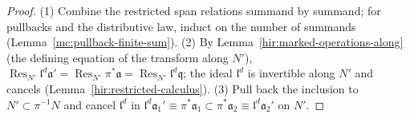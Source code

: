 \begin{proof}
\leanok
(1) Combine the restricted span relations summand by summand; for pullbacks and the distributive law, induct on the number of summands
(Lemma~\ref{mc:pullback-finite-sum}). (2) By Lemma~\ref{hir:marked-operations-along} (the defining equation of the transform along \(N'\)),
\(\operatorname{Res}_{N'}\mathfrak l^d\mathfrak a'=\operatorname{Res}_{N'}\pi^*\mathfrak a=\operatorname{Res}_{N'}\mathfrak l^d\mathfrak q\); the ideal \(\mathfrak l^d\) is invertible along
\(N'\) and cancels (Lemma~\ref{hir:restricted-calculus}). (3) Pull back the inclusion to \(N'\subset\pi^{-1}N\) and cancel \(\mathfrak l^d\) in
\(\mathfrak l^d\mathfrak a_1'\equiv\pi^*\mathfrak a_1\subset\pi^*\mathfrak a_2\equiv\mathfrak l^d\mathfrak a_2'\) on \(N'\).
\end{proof}

